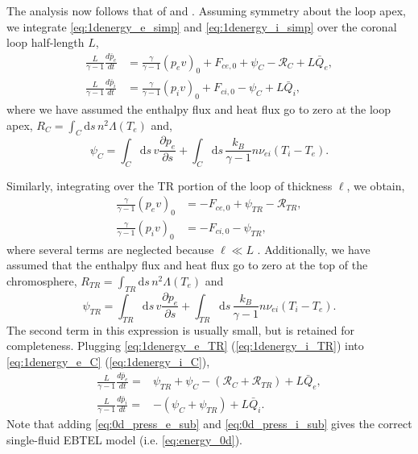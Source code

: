 The analysis now follows that of \citet{klimchuk_highly_2008} and \citet{cargill_enthalpy-based_2012}. Assuming symmetry about the loop apex, we integrate \autoref{eq:1denergy_e_simp} and \autoref{eq:1denergy_i_simp} over the coronal loop half-length $L$,
\begin{align}
    \frac{L}{\gamma - 1}\frac{d \bar{p}_e}{dt} &= \frac{\gamma}{\gamma - 1}(p_ev)_0 + F_{ce,0} + \psi_C - \mathcal{R}_C + L\bar{Q}_{e},\label{eq:1denergy_e_C} \\[0.5em]
    \frac{L}{\gamma - 1}\frac{d \bar{p}_i}{dt} &= \frac{\gamma}{\gamma - 1}(p_iv)_0 + F_{ci,0} - \psi_C + L\bar{Q}_{i},\label{eq:1denergy_i_C}
\end{align}
where we have assumed the enthalpy flux and heat flux go to zero at the loop apex, $R_C=\int_C\mathrm{d}s\,n^2\Lambda(T_e)$ and,
\begin{equation}
    \psi_C=\int_C\mathrm{d}s\,v\frac{\partial p_e}{\partial s} + \int_C\mathrm{d}s\,\frac{k_B}{\gamma - 1}n\nu_{ei}(T_i - T_e).
\end{equation}

Similarly, integrating over the TR portion of the loop of thickness $\ell$, we obtain,
\begin{align}
    \frac{\gamma}{\gamma - 1}(p_ev)_0 &= - F_{ce,0} + \psi_{TR} - \mathcal{R}_{TR}, \label{eq:1denergy_e_TR} \\[0.5em]
    \frac{\gamma}{\gamma - 1}(p_iv)_0 &=  - F_{ci,0} - \psi_{TR}, \label{eq:1denergy_i_TR}
\end{align}
where several terms are neglected because $\ell\ll L$ \citep{klimchuk_highly_2008}. Additionally, we have assumed that the enthalpy flux and heat flux go to zero at the top of the chromosphere, $R_{TR}=\int_{TR}\mathrm{d}s\,n^2\Lambda(T_e)$ and
\begin{equation}
    \psi_{TR}=\int_{TR}\mathrm{d}s\,v\frac{\partial p_e}{\partial s} + \int_{TR}\mathrm{d}s\,\frac{k_B}{\gamma - 1}n\nu_{ei}(T_i - T_e).
\end{equation}
The second term in this expression is usually small, but is retained for completeness.  Plugging \autoref{eq:1denergy_e_TR} (\autoref{eq:1denergy_i_TR}) into \autoref{eq:1denergy_e_C} (\autoref{eq:1denergy_i_C}),
\begin{align}
    \frac{L}{\gamma - 1}\frac{d\bar{p}_e}{dt} =& \psi_{TR} + \psi_C -(\mathcal{R}_C + \mathcal{R}_{TR}) + L\bar{Q}_{e},\label{eq:0d_press_e_sub} \\[0.5em]
    \frac{L}{\gamma - 1}\frac{d\bar{p}_i}{dt} =& -(\psi_{C} + \psi_{TR}) +  L\bar{Q}_{i}.\label{eq:0d_press_i_sub}
\end{align}
Note that adding \autoref{eq:0d_press_e_sub} and \autoref{eq:0d_press_i_sub} gives the correct single-fluid EBTEL model (i.e. \autoref{eq:energy_0d}).

